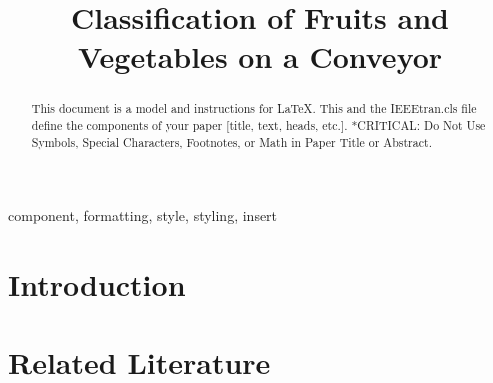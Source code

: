 \documentclass[conference]{IEEEtran}
\begin{document}
	
	\title{Classification of Fruits and Vegetables on a Conveyor}
		\author{
		\and
		\and
	}
	
	\maketitle
	
	\begin{abstract}
		This document is a model and instructions for \LaTeX.
		This and the IEEEtran.cls file define the components of your paper [title, text, heads, etc.]. *CRITICAL: Do Not Use Symbols, Special Characters, Footnotes, 
		or Math in Paper Title or Abstract.
	\end{abstract}
	
	\begin{IEEEkeywords}
		component, formatting, style, styling, insert
	\end{IEEEkeywords}
	
	\section{Introduction}
	
	
	\section{Related Literature}
	
	
\end{document}

